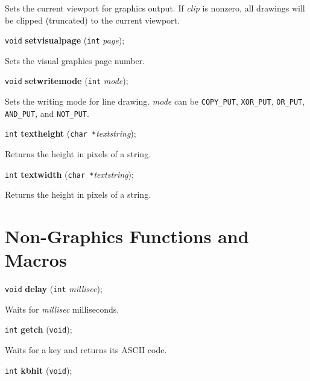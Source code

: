 \documentclass[a4paper,11pt]{article}
\newcommand{\V}{\texttt{void}}      %
\newcommand{\I}{\texttt{int}}       %
\newcommand{\C}{\texttt{char *}}    %
\newcommand{\func}[1]{\textbf{#1}}  %
\newcommand{\A}[1]{\emph{#1}}       %
\newcommand{\T}[1]{\texttt{#1}}     %
\newenvironment{bgi}
{ %
  \begin{snugshade}
}
{ %
  \end{snugshade}
}
\begin{document}
Sets the current viewport for graphics output. If \A{clip} is nonzero,
all drawings will be clipped (truncated) to the current viewport.


\begin{bgi}
\V{} \func{setvisualpage} (\I{} \A{page});
\end{bgi}

Sets the visual graphics page number.


\begin{bgi}
\V{} \func{setwritemode} (\I{} \A{mode});
\end{bgi}

Sets the writing mode for line drawing. \A{mode} can be \T{COPY\_PUT},
\T{XOR\-\_PUT}, \T{OR\_PUT}, \T{AND\_PUT}, and \T{NOT\_PUT}.


\begin{bgi}
\I{} \func{textheight} (\C{}\A{textstring});
\end{bgi}

Returns the height in pixels of a string.


\begin{bgi}
\I{} \func{textwidth} (\C{}\A{textstring});
\end{bgi}

Returns the height in pixels of a string.


\section{Non-Graphics Functions and Macros}

\begin{bgi}
\V{} \func{delay} (\I{} \A{millisec});
\end{bgi}

Waits for \A{millisec} milliseconds.


\begin{bgi}
\I{} \func{getch} (\V{});
\end{bgi}

Waits for a key and returns its ASCII code.


\begin{bgi}
\I{} \func{kbhit} (\V{});
\end{bgi}
\end{document}
